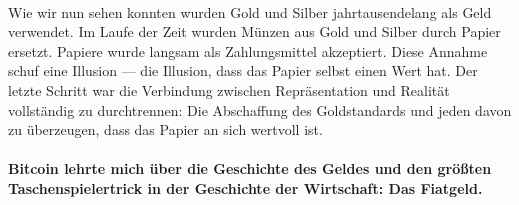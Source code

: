 \paragraph{}
Wie wir nun sehen konnten wurden Gold und Silber jahrtausendelang als Geld
verwendet. Im Laufe der Zeit wurden Münzen aus Gold und Silber durch Papier
ersetzt. Papiere wurde langsam als Zahlungsmittel akzeptiert. Diese Annahme
schuf eine Illusion --- die Illusion, dass das Papier selbst einen Wert hat. Der
letzte Schritt war die Verbindung zwischen Repräsentation und Realität
vollständig zu durchtrennen: Die Abschaffung des Goldstandards und jeden davon
zu überzeugen, dass das Papier an sich wertvoll ist.

\paragraph{Bitcoin lehrte mich über die Geschichte des Geldes und den größten
Taschenspielertrick in der Geschichte der Wirtschaft: Das Fiatgeld.}

%
%
%
%
